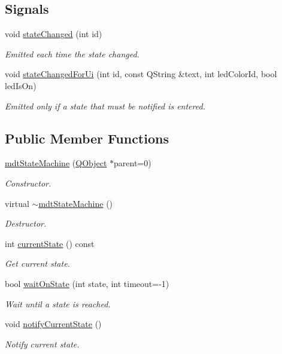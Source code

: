 \subsection*{Signals}
\begin{DoxyCompactItemize}
\item 
void \hyperlink{classmdt_state_machine_a57952ce2e02e44a57c70695067dc8b86}{state\-Changed} (int id)
\begin{DoxyCompactList}\small\item\em Emitted each time the state changed. \end{DoxyCompactList}\item 
void \hyperlink{classmdt_state_machine_a3ff507d3d9256107038ceb0c3dfba9c8}{state\-Changed\-For\-Ui} (int id, const Q\-String \&text, int led\-Color\-Id, bool led\-Is\-On)
\begin{DoxyCompactList}\small\item\em Emitted only if a state that must be notified is entered. \end{DoxyCompactList}\end{DoxyCompactItemize}
\subsection*{Public Member Functions}
\begin{DoxyCompactItemize}
\item 
\hyperlink{classmdt_state_machine_af2b15b9b0bbf48c6adb75a69dd255718}{mdt\-State\-Machine} (\hyperlink{class_q_object}{Q\-Object} $\ast$parent=0)
\begin{DoxyCompactList}\small\item\em Constructor. \end{DoxyCompactList}\item 
virtual \hyperlink{classmdt_state_machine_ac32776aa0587ec290576e6e2cafb631f}{$\sim$mdt\-State\-Machine} ()
\begin{DoxyCompactList}\small\item\em Destructor. \end{DoxyCompactList}\item 
int \hyperlink{classmdt_state_machine_a16a99b2d6d077e1ea39622ef0e2b5a5b}{current\-State} () const 
\begin{DoxyCompactList}\small\item\em Get current state. \end{DoxyCompactList}\item 
bool \hyperlink{classmdt_state_machine_ab14dc03757e493d35d510af8a1b436b6}{wait\-On\-State} (int state, int timeout=-\/1)
\begin{DoxyCompactList}\small\item\em Wait until a state is reached. \end{DoxyCompactList}\item 
void \hyperlink{classmdt_state_machine_a6fa653fc7e2ea8a58e2d160ba6d96013}{notify\-Current\-State} ()
\begin{DoxyCompactList}\small\item\em Notify current state. \end{DoxyCompactList}\end{DoxyCompactItemize}


